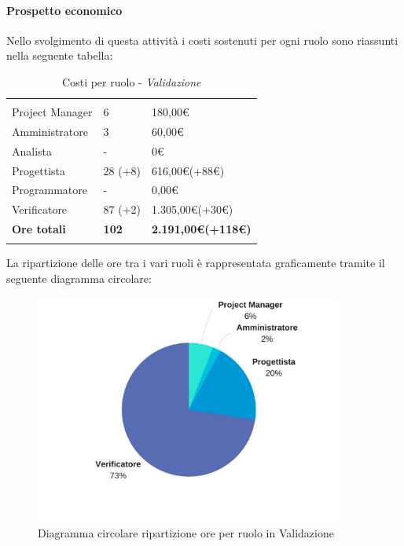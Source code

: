 \paragraph{Prospetto economico}	\Spazio
Nello svolgimento di questa attività i costi sostenuti per ogni ruolo sono riassunti nella seguente tabella:
\begin{table}[H]
	\centering
	\begin{tabular}{|p{4cm}|C{4cm}|C{4cm}|}
		
		 & &\\
		Project Manager & 6 & 180,00\euro \\
		\hline
		Amministratore& 3 & 60,00\euro \\
		\hline
		Analista & - & 0\euro \\
		\hline
		Progettista & 28 (+8) & 616,00\euro (+88\euro) \\
		\hline
		Programmatore & - & 0,00\euro \\
		\hline
		Verificatore & 87 (+2) & 1.305,00\euro (+30\euro) \\
		\hline
		\textbf{Ore totali} & \textbf{102} & \textbf{2.191,00\euro(+118\euro)} \\
	\end{tabular}
	\caption{Costi per ruolo - \textit{Validazione}}
\end{table}

La ripartizione delle ore tra i vari ruoli è rappresentata graficamente tramite il seguente diagramma circolare:
\begin{figure}[H] 
	\centering 
	\includegraphics[width=0.9\textwidth]{images/CircolareValidazioneNuova.png} 
	\caption{Diagramma circolare ripartizione ore per ruolo in Validazione}
	\label{CircolareValidazione}
\end{figure}

